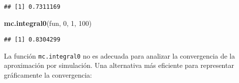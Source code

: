 \documentclass[
]{book}
\newenvironment{Shaded}{\begin{snugshade}}{\end{snugshade}}
\newcommand{\DecValTok}[1]{\textcolor[rgb]{0.00,0.00,0.81}{#1}}
\newcommand{\KeywordTok}[1]{\textcolor[rgb]{0.13,0.29,0.53}{\textbf{#1}}}
\newcommand{\NormalTok}[1]{#1}
\theoremstyle{break}
\theoremstyle{definition}
\theoremstyle{definition}
\theoremstyle{definition}
\theoremstyle{remark}
\begin{document}
\begin{verbatim}
## [1] 0.7311169
\end{verbatim}

\begin{Shaded}
\begin{Highlighting}[]
\KeywordTok{mc.integral0}\NormalTok{(fun, }\DecValTok{0}\NormalTok{, }\DecValTok{1}\NormalTok{, }\DecValTok{100}\NormalTok{)}
\end{Highlighting}
\end{Shaded}

\begin{verbatim}
## [1] 0.8304299
\end{verbatim}

La función \texttt{mc.integral0} no es adecuada para analizar la convergencia
de la aproximación por simulación.
Una alternativa más eficiente para representar gráficamente la convergencia:
\end{document}
